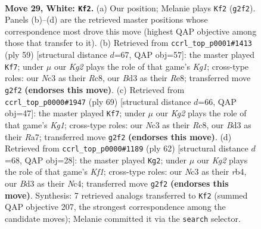 \documentclass[11pt]{article}
\begin{document}
\clearpage

\begin{figure}[p]\centering
\begin{subfigure}{0.46\textwidth}\centering
\resizebox{\linewidth}{!}{%
\newchessgame
\chessboard[
  setfen={r7/3bk3/1pn1p3/p3P3/P5r1/1PNB2P1/6K1/R2R4 w - - 1 29},
  showmover=false,
  pgfstyle=straightmove, color=movearrow, markmove={g2-f2}
]}
\caption{}
\end{subfigure}\hfill
\begin{subfigure}{0.46\textwidth}\centering
\resizebox{\linewidth}{!}{%
\newchessgame
\chessboard[
  setfen={2r1r1k1/6b1/6p1/p1p4p/2Rp1B2/1P4PP/P4PK1/3R4 b - - 1 30},
  showmover=false,
  pgfstyle=straightmove, color=movearrow, markmove={g8-f7}
]}
\caption{}
\end{subfigure}
\\[4pt]
\begin{subfigure}{0.46\textwidth}\centering
\resizebox{\linewidth}{!}{%
\newchessgame
\chessboard[
  setfen={2r3k1/r3n1p1/2p2p1p/2R4P/p2R4/P5P1/5PK1/2B5 b - - 0 35},
  showmover=false,
  pgfstyle=straightmove, color=movearrow, markmove={g8-f7}
]}
\caption{}
\end{subfigure}\hfill
\begin{subfigure}{0.46\textwidth}\centering
\resizebox{\linewidth}{!}{%
\newchessgame
\chessboard[
  setfen={8/2p3pk/r4pp1/P3p2n/1rN1P3/6P1/5P2/R1R2K2 w - - 1 32},
  showmover=false,
  pgfstyle=straightmove, color=movearrow, markmove={f1-g2}
]}
\caption{}
\end{subfigure}
\caption{\textbf{Move 29, White: \texttt{Kf2}.} (a) Our position; Melanie plays \texttt{Kf2} (\texttt{g2f2}). Panels (b)--(d) are the retrieved master positions whose correspondence most drove this move (highest QAP objective among those that transfer to it). (b) Retrieved from \texttt{ccrl\_top\_p0001\#1413} (ply 59) [structural distance $d$=67, QAP obj=57]: the master played \texttt{Kf7}; under $\mu$ our \emph{Kg2} plays the role of that game's \emph{Kg1}; cross-type roles: our \emph{N}c3 as their \emph{R}c8, our \emph{B}d3 as their \emph{R}e8; transferred move \texttt{g2f2} \textbf{(endorses this move)}. (c) Retrieved from \texttt{ccrl\_top\_p0000\#1947} (ply 69) [structural distance $d$=66, QAP obj=47]: the master played \texttt{Kf7}; under $\mu$ our \emph{Kg2} plays the role of that game's \emph{Kg1}; cross-type roles: our \emph{N}c3 as their \emph{R}c8, our \emph{B}d3 as their \emph{R}a7; transferred move \texttt{g2f2} \textbf{(endorses this move)}. (d) Retrieved from \texttt{ccrl\_top\_p0000\#1189} (ply 62) [structural distance $d$=68, QAP obj=28]: the master played \texttt{Kg2}; under $\mu$ our \emph{Kg2} plays the role of that game's \emph{Kf1}; cross-type roles: our \emph{N}c3 as their \emph{r}b4, our \emph{B}d3 as their \emph{N}c4; transferred move \texttt{g2f2} \textbf{(endorses this move)}. Synthesis: 7 retrieved analogs transferred to \texttt{Kf2} (summed QAP objective 207, the strongest correspondence among the candidate moves); Melanie committed it via the \texttt{search} selector.}
\label{fig:thought-m56}
\end{figure}
\end{document}
